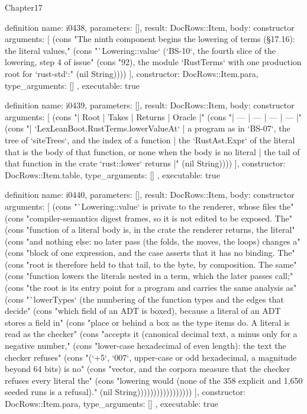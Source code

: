 \begin{lexlean}{Chapter17}
\begin{semanticmodule}
definition{
  name: i0438,
  parameters: [],
  result: DocRows::Item,
  body: constructor{
    arguments: [
      (cons "The ninth component begins the lowering of terms (§17.16): the literal values," (cons "`Lowering::value` (`BS-10`, the fourth slice of the lowering, step 4 of issue" (cons "92), the module `RustTerms` with one production root for `rust-std`:" (nil String))))
    ],
    constructor: DocRows::Item.para,
    type_arguments: []
  },
  executable: true
}

definition{
  name: i0439,
  parameters: [],
  result: DocRows::Item,
  body: constructor{
    arguments: [
      (cons "| Root | Takes | Returns | Oracle |" (cons "| --- | --- | --- | --- |" (cons "| `LexLeanBoot.RustTerms.lowerValueAt` | a program as in `BS-07`, the tree of `siteTrees`, and the index of a function | the `RustAst.Expr` of the literal that is the body of that function, or none when the body is no literal | the tail of that function in the crate `rust::lower` returns |" (nil String))))
    ],
    constructor: DocRows::Item.table,
    type_arguments: []
  },
  executable: true
}

definition{
  name: i0440,
  parameters: [],
  result: DocRows::Item,
  body: constructor{
    arguments: [
      (cons "`Lowering::value` is private to the renderer, whose files the" (cons "compiler-semantics digest frames, so it is not edited to be exposed. The" (cons "function of a literal body is, in the crate the renderer returns, the literal" (cons "and nothing else: no later pass (the folds, the moves, the loops) changes a" (cons "block of one expression, and the case asserts that it has no binding. The" (cons "root is therefore held to that tail, to the byte, by composition. The same" (cons "function lowers the literals nested in a term, which the later passes call;" (cons "the root is its entry point for a program and carries the same analysis as" (cons "`lowerTypes` (the numbering of the function types and the edges that decide" (cons "which field of an ADT is boxed), because a literal of an ADT stores a field in" (cons "place or behind a box as the type items do. A literal is read as the checker" (cons "accepts it (canonical decimal text, a minus only for a negative number," (cons "lower-case hexadecimal of even length): the text the checker refuses" (cons "(`+5`, `007`, upper-case or odd hexadecimal, a magnitude beyond 64 bits) is no" (cons "vector, and the corpora measure that the checker refuses every literal the" (cons "lowering would (none of the 358 explicit and 1,650 seeded runs is a refusal)." (nil String)))))))))))))))))
    ],
    constructor: DocRows::Item.para,
    type_arguments: []
  },
  executable: true
}


\end{semanticmodule}
\end{lexlean}
